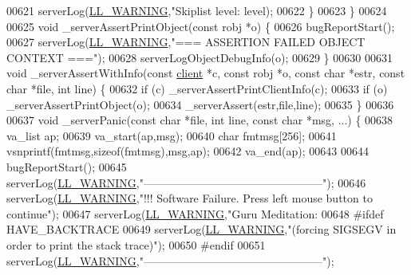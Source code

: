 \begin{DoxyCode}
{{{{{{{{{{{{{{{{{{{{{{{{{{{{{{{{{{{{{{{{00621             serverLog(\hyperlink{server_8h_a31229b9334bba7d6be2a72970967a14b}{LL\_WARNING},\textcolor{stringliteral}{"Skiplist level: %
      level);
00622     \}
00623 \}
00624 
00625 \textcolor{keywordtype}{void} \_serverAssertPrintObject(\textcolor{keyword}{const} robj *o) \{
00626     bugReportStart();
00627     serverLog(\hyperlink{server_8h_a31229b9334bba7d6be2a72970967a14b}{LL\_WARNING},\textcolor{stringliteral}{"=== ASSERTION FAILED OBJECT CONTEXT ==="});
00628     serverLogObjectDebugInfo(o);
00629 \}
00630 
00631 \textcolor{keywordtype}{void} \_serverAssertWithInfo(\textcolor{keyword}{const} \hyperlink{structclient}{client} *c, \textcolor{keyword}{const} robj *o, \textcolor{keyword}{const} \textcolor{keywordtype}{char} *estr, \textcolor{keyword}{const} \textcolor{keywordtype}{char} *file, \textcolor{keywordtype}{
      int} line) \{
00632     \textcolor{keywordflow}{if} (c) \_serverAssertPrintClientInfo(c);
00633     \textcolor{keywordflow}{if} (o) \_serverAssertPrintObject(o);
00634     \_serverAssert(estr,file,line);
00635 \}
00636 
00637 \textcolor{keywordtype}{void} \_serverPanic(\textcolor{keyword}{const} \textcolor{keywordtype}{char} *file, \textcolor{keywordtype}{int} line, \textcolor{keyword}{const} \textcolor{keywordtype}{char} *msg, ...) \{
00638     va\_list ap;
00639     va\_start(ap,msg);
00640     \textcolor{keywordtype}{char} fmtmsg[256];
00641     vsnprintf(fmtmsg,\textcolor{keyword}{sizeof}(fmtmsg),msg,ap);
00642     va\_end(ap);
00643 
00644     bugReportStart();
00645     serverLog(\hyperlink{server_8h_a31229b9334bba7d6be2a72970967a14b}{LL\_WARNING},\textcolor{stringliteral}{"------------------------------------------------"});
00646     serverLog(\hyperlink{server_8h_a31229b9334bba7d6be2a72970967a14b}{LL\_WARNING},\textcolor{stringliteral}{"!!! Software Failure. Press left mouse button to continue"});
00647     serverLog(\hyperlink{server_8h_a31229b9334bba7d6be2a72970967a14b}{LL\_WARNING},\textcolor{stringliteral}{"Guru Meditation: %
00648 \textcolor{preprocessor}{#}\textcolor{preprocessor}{ifdef} HAVE\_BACKTRACE
00649     serverLog(\hyperlink{server_8h_a31229b9334bba7d6be2a72970967a14b}{LL\_WARNING},\textcolor{stringliteral}{"(forcing SIGSEGV in order to print the stack trace)"});
00650 \textcolor{preprocessor}{#}\textcolor{preprocessor}{endif}
00651     serverLog(\hyperlink{server_8h_a31229b9334bba7d6be2a72970967a14b}{LL\_WARNING},\textcolor{stringliteral}{"------------------------------------------------"});
}}}}}}}}}}}}}}}}}}}}}}}}}}}}}}}}}}}}}}}}}}
\end{DoxyCode}
